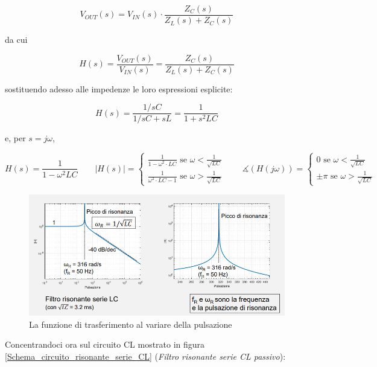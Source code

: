 \documentclass{article}
\begin{document}
\[V_{OUT}(s) = V_{IN}(s) \cdot \frac{Z_C(s)}{Z_L(s) + Z_C(s)}\]

da cui

\[H(s) = \frac{V_{OUT} (s)}{V_{IN} (s)} = \frac{Z_C(s)}{Z_L(s) + Z_C(s)}\]

sostituendo adesso alle impedenze le loro espressioni esplicite:

\[H(s) = \frac{1/sC}{1/sC + sL} = \frac{1}{1 + s^2 LC}\]

e, per $s = j\omega$, 

\[H(s) = \frac{1}{1 - \omega ^2 LC} \quad \quad |H(s)| = \begin{cases} \frac{1}{1 - \omega ^2 \cdot LC} \textrm{ se } \omega < \frac{1}{\sqrt{LC}} \\ \frac{1}{\omega ^2 \cdot LC - 1} \textrm{ se } \omega > \frac{1}{\sqrt{LC}} \end{cases} \quad \quad \measuredangle (H(j \omega)) = \begin{cases} 0 \textrm{ se } \omega < \frac{1}{\sqrt{LC}} \\ \pm \pi \textrm{ se } \omega > \frac{1}{\sqrt{LC}} \end{cases}\]

\begin{figure}[h]
  \centering
  \includegraphics[scale=0.55]{IM_circuito_risonante_serie_LC_grafici}
  \caption{La funzione di trasferimento al variare della pulsazione}
  \label{Schema_circuito_risonante_serie_LC_grafici}
\end{figure}

\clearpage
Concentrandoci ora sul circuito CL mostrato in figura \ref{Schema_circuito_risonante_serie_CL} (\textit{Filtro risonante serie CL passivo}):
\end{document}
